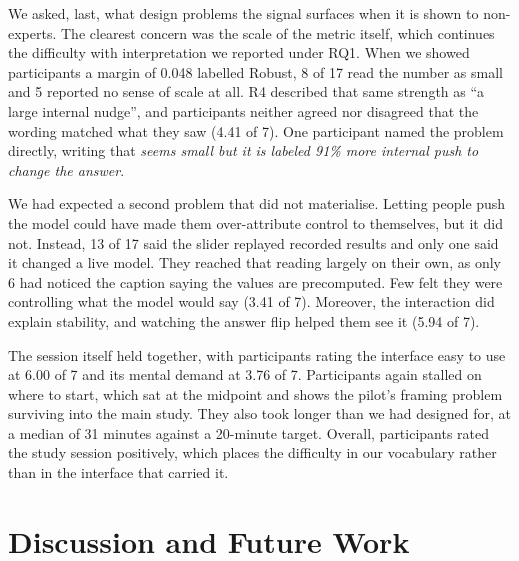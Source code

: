 \documentclass[sigconf]{acmart}
\newcommand{\pq}[1]{\emph{\guillemotleft #1\guillemotright}}
\begin{document}
We asked, last, what design problems the signal surfaces when it is shown to non-experts. The clearest concern
was the scale of the metric itself, which continues the difficulty with interpretation we reported under RQ1.
When we showed participants a margin of 0.048 labelled Robust, 8 of 17 read the number as small and 5 reported
no sense of scale at all. R4 described that same strength as ``a large internal nudge'', and participants
neither agreed nor disagreed that the wording matched what they saw (4.41 of 7). One participant named the
problem directly, writing that \pq{0.048 seems small but it is labeled 91\% more internal push to change the
answer}.

We had expected a second problem that did not materialise. Letting people push the model could have made them
over-attribute control to themselves, but it did not. Instead, 13 of 17 said the slider replayed recorded
results and only one said it changed a live model. They reached that reading largely on their own, as only 6 had
noticed the caption saying the values are precomputed. Few felt they were controlling what the model would say
(3.41 of 7). Moreover, the interaction did explain stability, and watching the answer flip helped them see it
(5.94 of 7).

The session itself held together, with participants rating the interface easy to use at 6.00 of 7 and its mental
demand at 3.76 of 7. Participants again stalled on where to start, which sat at the midpoint and shows the
pilot's framing problem surviving into the main study. They also took longer than we had designed for, at a
median of 31 minutes against a 20-minute target. Overall, participants rated the study session positively, which
places the difficulty in our vocabulary rather than in the interface that carried it.

\section{Discussion and Future Work}
\label{sec:discussion}
\end{document}
